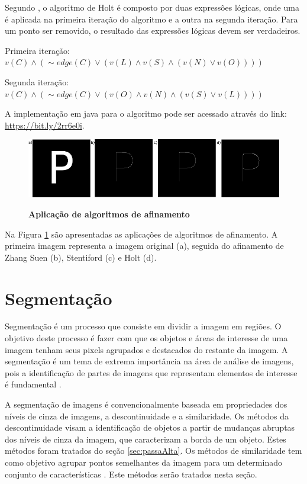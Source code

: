 \documentclass[
	12pt,				%
	oneside,			%
	a4paper,			%
	english,			%
	french,				%
	spanish,			%
	brazil,				%
	]{abntex2}
\begin{document}
Segundo \citet{guilherme:2007}, o algoritmo de Holt é composto por duas expressões lógicas, onde uma é aplicada na primeira iteração do algoritmo e a outra na segunda iteração. Para um ponto ser removido, o resultado das expressões lógicas devem ser verdadeiros.

Primeira iteração: 
\(v(C) \wedge (\sim edge(C) \vee (v(L) \wedge v(S) \wedge (v(N) \vee v(O))))\)

Segunda iteração:
\(v(C) \wedge (\sim edge(C) \vee (v(O) \wedge v(N) \wedge (v(S) \vee v(L))))\)

A implementação em java para o algoritmo pode ser acessado através do link: \url{https://bit.ly/2rr6e0i}. 

\begin{figure}[ht]
\centering
\caption{\textbf{Aplicação de algoritmos de afinamento}}
\includegraphics[width=1\textwidth]{imagens/esqueletizacao.png}
\sourceAuthor
\label{fig:esqueletizacao}
\end{figure}

Na Figura \ref{fig:esqueletizacao} são apresentadas as aplicações de algoritmos de afinamento. A primeira imagem representa a imagem original (a), seguida do afinamento de Zhang Suen (b), Stentiford (c) e Holt (d). 
   
\section{Segmentação}  

Segmentação é um processo que consiste em dividir a imagem em regiões. O objetivo deste processo é fazer com que os objetos e áreas de interesse de uma imagem tenham seus pixels agrupados e destacados do restante da imagem. A segmentação é um tema de extrema importância na área de análise de imagens, pois a identificação de partes de imagens que representam elementos de interesse é fundamental \cite{conciAzevedoLeta:2008}.  

A segmentação de imagens é convencionalmente baseada em propriedades dos níveis de cinza de imagens, a descontinuidade e a similaridade. Os métodos da descontinuidade visam a identificação de objetos a partir de mudanças abruptas dos níveis de cinza da imagem, que caracterizam a borda de um objeto. Estes métodos foram tratados do seção \ref{sec:passaAlta}. Os métodos de similaridade tem como objetivo agrupar pontos semelhantes da imagem para um determinado conjunto de características \cite{pedriniSchwartz:2008}. Este métodos serão tratados nesta seção.
    
\end{document}
